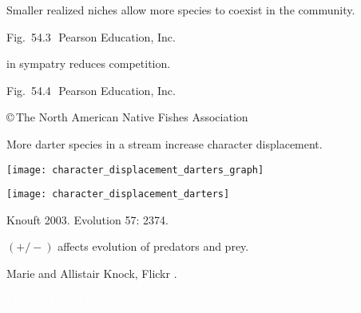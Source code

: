 \documentclass[t]{beamer}
\begin{document}
{
\begin{frame}[b]{Smaller realized niches allow more species to coexist in the community.}

	\tiny Fig.~54.3~\textcopyright\,Pearson Education, Inc.
\end{frame}
}
%
{
\begin{frame}[b]{ in sympatry reduces competition.}

	\hfill \tiny Fig.~54.4~\textcopyright\,Pearson Education, Inc.
\end{frame}
}
%

{
\begin{frame}[b]

	\hfill \tiny \copyright\,The North American Native Fishes Association
\end{frame}
}
%

\begin{frame}[t]{More darter species in a stream increase character displacement.}

	\vspace*{-\baselineskip}

	\begin{multicols}{2}
		{\centering
		\texttt{[image: character\_displacement\_darters\_graph]}
		
		}

	\columnbreak
	
			\texttt{[image: character\_displacement\_darters]}
			
\end{multicols}

\vfilll

\hfill \tiny Knouft 2003. Evolution 57: 2374.
\end{frame}
%
{
\begin{frame}[b]{ $(+ / -)$ affects evolution of predators and prey.}

	\hfill \tiny Marie and Allistair Knock, Flickr .
\end{frame}
}
%
{
\begin{frame}[b]{}
\tiny \textcolor{white}{MrClean1982, Flickr }
\end{frame}
}
%
{
\begin{frame}[b]{}
\end{frame}
}
%
\end{document}
